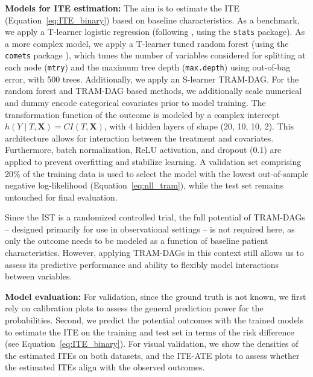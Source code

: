 \textbf{Models for ITE estimation: } The aim is to estimate the ITE (Equation~\ref{eq:ITE_binary}) based on baseline characteristics. As a benchmark, we apply a T-learner logistic regression (following \citet{chen2025}, using the \texttt{stats} package). As a more complex model, we apply a T-learner tuned random forest (using the \texttt{comets} package \citep{comets}), which tunes the number of variables considered for splitting at each node (\texttt{mtry}) and the maximum tree depth (\texttt{max.depth}) using out-of-bag error, with 500 trees. Additionally, we apply an S-learner TRAM-DAG. For the random forest and TRAM-DAG based methods, we additionally scale numerical and dummy encode categorical covariates prior to model training. The transformation function of the outcome is modeled by a complex intercept $h(Y \mid T, \mathbf{X}) = CI(T, \mathbf{X})$, with 4 hidden layers of shape (20, 10, 10, 2). This architecture allows for interaction between the treatment and covariates. Furthermore, batch normalization, ReLU activation, and dropout (0.1) are applied to prevent overfitting and stabilize learning. A validation set comprising 20\% of the training data is used to select the model with the lowest out-of-sample negative log-likelihood (Equation~\ref{eq:nll_tram}), while the test set remains untouched for final evaluation. 

Since the IST is a randomized controlled trial, the full potential of TRAM-DAGs -- designed primarily for use in observational settings -- is not required here, as only the outcome needs to be modeled as a function of baseline patient characteristics. However, applying TRAM-DAGs in this context still allows us to assess its predictive performance and ability to flexibly model interactions between variables.



\medskip

\textbf{Model evaluation: } For validation, since the ground truth is not known, we first rely on calibration plots to assess the general prediction power for the probabilities. Second, we predict the potential outcomes with the trained models to estimate the ITE on the training and test set in terms of the risk difference (see Equation~\ref{eq:ITE_binary}). For visual validation, we show the densities of the estimated ITEs on both datasets, and the ITE-ATE plots to assess whether the estimated ITEs align with the observed outcomes.










